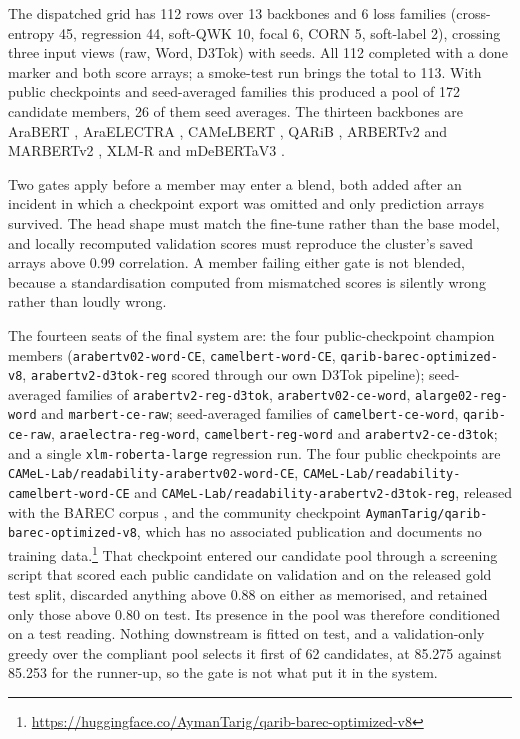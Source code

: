 The dispatched grid has 112 rows over 13 backbones and 6 loss families (cross-entropy 45,
regression 44, soft-QWK 10, focal 6, CORN 5, soft-label 2), crossing three input views (raw,
Word, D3Tok) with seeds. All 112 completed with a done marker and both score arrays; a
smoke-test run brings the total to 113. With
public checkpoints and seed-averaged families this produced a pool of 172 candidate members,
26 of them seed averages. The thirteen backbones are AraBERT
\citep{antoun-etal-2020-arabert}, AraELECTRA \citep{antoun-etal-2021-araelectra}, CAMeLBERT
\citep{inoue-etal-2021-interplay}, QARiB \citep{abdelali-etal-2021-qarib}, ARBERTv2 and
MARBERTv2 \citep{abdul-mageed-etal-2021-arbert}, XLM-R
\citep{conneau-etal-2020-unsupervised} and mDeBERTaV3 \citep{he-etal-2023-debertav3}.

Two gates apply before a member may enter a blend, both added after an incident in which a
checkpoint export was omitted and only prediction arrays survived. The head shape must match
the fine-tune rather than the base model, and locally recomputed validation scores must
reproduce the cluster's saved arrays above 0.99 correlation. A member failing either gate is
not blended, because a standardisation computed from mismatched scores is silently wrong
rather than loudly wrong.

\begin{sloppypar}
The fourteen seats of the final system are: the four public-checkpoint champion members
(\texttt{arabertv02-word-CE}, \texttt{camelbert-word-CE},
\texttt{qarib-barec-optimized-v8}, \texttt{arabertv2-d3tok-reg} scored through our own
D3Tok pipeline); seed-averaged families of \texttt{arabertv2-reg-d3tok},
\texttt{arabertv02-ce-word}, \texttt{alarge02-reg-word} and \texttt{marbert-ce-raw};
seed-averaged families of \texttt{camelbert-ce-word},
\texttt{qarib-ce-raw}, \texttt{araelectra-reg-word}, \texttt{camelbert-reg-word} and
\texttt{arabertv2-ce-d3tok}; and a single \texttt{xlm-roberta-large} regression run. The four public checkpoints are
\texttt{CAMeL-Lab/\allowbreak readability-\allowbreak arabertv02-word-CE},
\texttt{CAMeL-Lab/\allowbreak readability-\allowbreak camelbert-word-CE} and
\texttt{CAMeL-Lab/\allowbreak readability-\allowbreak arabertv2-d3tok-reg}, released with the BAREC corpus
\citep{elmadani-etal-2025-large}, and the community checkpoint
\texttt{AymanTarig/\allowbreak qarib-barec-optimized-v8}, which has no associated
publication and documents no training
data.\footnote{\url{https://huggingface.co/AymanTarig/qarib-barec-optimized-v8}} That
checkpoint entered our candidate pool through a screening script that scored each public
candidate on validation and on the released gold test split, discarded anything above 0.88 on
either as memorised, and retained only those above 0.80 on test. Its presence in the pool was
therefore conditioned on a test reading. Nothing downstream is fitted on test, and a
validation-only greedy over the compliant pool selects it first of 62 candidates, at 85.275
against 85.253 for the runner-up, so the gate is not what put it in the system.
\end{sloppypar}

